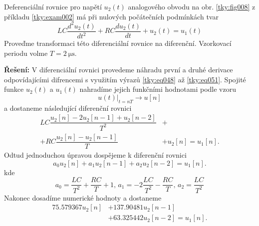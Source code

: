 \begin{mdframed}[style=mdexam]
  \begin{example}\label{tky:exam003}
    Deferenciální rovnice pro napětí \(u_2(t)\) analogového obvodu na obr. \ref{tky:fig008} z
    příkladu \ref{tky:exam002} má při nulových počátečních podmínkách tvar
    \begin{equation*}
      LC\frac{d^2u_2(t)}{dt^2}+RC\frac{du_2(t)}{dt}+u_2(t)=u_1(t)
    \end{equation*}
    Proveďme transformaci této diferenciální rovnice na diferenční. Vzorkovací periodu volme \(T =
    \SI{2}{\us}\). 

    \noindent\textbf{Řešení:}
    V diferenciální rovnici provedeme náhradu první a druhé derivace odpovídajícími difrencemi s
    využitím výrazů \ref{tky:eq048} až \ref{tky:eq051}. Spojité funkce \(u_2(t)\) a \(u_1(t)\)
    nahradíme jejich funkčními hodnotami podle vzoru
    \begin{equation*}
      \left.u(t)\right\rvert_{t=nT}  \rightarrow u[n]
    \end{equation*}
    a dostaneme následující diferenční rovnici
    \begin{align*}
        LC\dfrac{u_2[n] - 2u_2[n-1]    + u_2[n-2]}{T^2} &+      \\
      + RC\dfrac{u_2[n] - u_2[n-1]}{T}                  &+ u_2[n]=u_1[n]. 
    \end{align*}
    Odtud jednoduchou úpravou dospějeme k diferenční rovnici
    \begin{equation*}
      a_0u_2[n] + a_1u_2[n-1] + a_2u_2[n-2]=u_1[n].
    \end{equation*}
    kde
    \begin{equation*}
      a_0 = \frac{LC}{T^2} + \frac{RC}{T} + 1, \, a_1 = -2\frac{LC}{T^2} - \frac{RC}{T}, \,  
      a_2 = \frac{LC}{T^2}
    \end{equation*}
    Nakonec dosadíme numerické hodnoty a dostaneme
    \begin{align*}
      \num{75.579367}u_2[n] &+ \num{137.90481}u_2[n-1]                       \\
                            &+ \num{63.325442}u_2[n-2] = u_1[n].
    \end{align*}
  \end{example}
\end{mdframed}